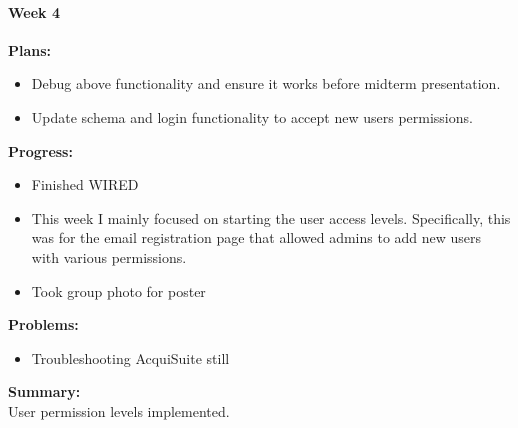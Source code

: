 \paragraph{Week 4}
\begin{adjustwidth}{2.5em}{0pt}
    \vspace{-0.5cm}\textbf{Plans:}
    \vspace{-0.5cm}
    \begin{itemize}
        \item Debug above functionality and ensure it works before midterm presentation. 
		\item Update schema and login functionality to accept new users permissions. 
    \end{itemize} 
    \vspace{-0.3cm}\textbf{Progress:}
    \vspace{-0.5cm}
    \begin{itemize}
        \item Finished WIRED
        \item This week I mainly focused on starting the user access levels. Specifically, this was for the email registration page that allowed admins to add new users with various permissions.
        \item Took group photo for poster
    \end{itemize} 
    \vspace{-0.3cm}\textbf{Problems:}
    \vspace{-0.5cm}
    \begin{itemize}
        \item Troubleshooting AcquiSuite still
    \end{itemize}  
    \vspace{-0.3cm}\noindent\textbf{Summary:}\\
    \noindent User permission levels implemented. 
\end{adjustwidth} 
